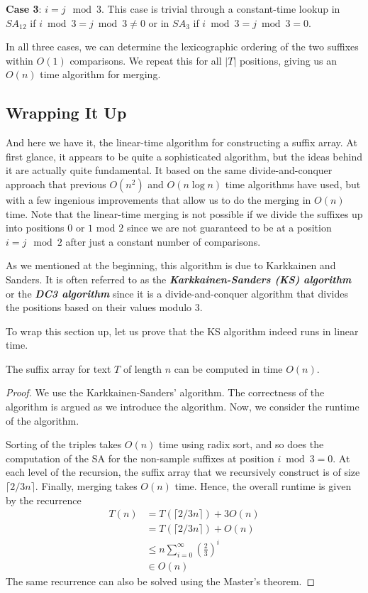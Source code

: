\textbf{Case 3}: $i = j \mod 3$. This case is trivial through a constant-time lookup in $SA_{12}$ if $i \bmod 3 = j \bmod 3 \neq 0$ or in $SA_{3}$ if $i \bmod 3 = j \bmod 3 = 0$.

In all three cases, we can determine the lexicographic ordering of the two suffixes within $O(1)$ comparisons. We repeat this for all $|T|$ positions, giving us an $O(n)$ time algorithm for merging.

\subsection{Wrapping It Up}

And here we have it, the linear-time algorithm for constructing a suffix array. At first glance, it appears to be quite a sophisticated algorithm, but the ideas behind it are actually quite fundamental. It based on the same divide-and-conquer approach that previous $O(n^2)$ and $O(n \log n)$ time algorithms have used, but with a few ingenious improvements that allow us to do the merging in $O(n)$ time. Note that the linear-time merging is not possible if we divide the suffixes up into positions $0$ or $1$ mod $2$ since we are not guaranteed to be at a position $i=j \mod 2$ after just a constant number of comparisons.

As we mentioned at the beginning, this algorithm is due to Karkkainen and Sanders. It is often referred to as the \textit{\textbf{Karkkainen-Sanders (KS) algorithm}} or the \textit{\textbf{DC3 algorithm}} since it is a divide-and-conquer algorithm that divides the positions based on their values modulo 3.

To wrap this section up, let us prove that the KS algorithm indeed runs in linear time.

\begin{theorem}
    The suffix array for text $T$ of length $n$ can be computed in time $O(n)$.
\end{theorem}

\begin{proof}
    We use the Karkkainen-Sanders' algorithm. The correctness of the algorithm is argued as we introduce the algorithm. Now, we consider the runtime of the algorithm.

    Sorting of the triples takes $O(n)$ time using radix sort, and so does the computation of the SA for the non-sample suffixes at position $i \bmod 3 = 0$. At each level of the recursion, the suffix array that we recursively construct is of size $\lceil 2/3n \rceil$. Finally, merging takes $O(n)$ time. Hence, the overall runtime is given by the recurrence
    $$
    \begin{aligned}
        T(n) &= T(\lceil 2/3n \rceil) + 3O(n) \\
        &= T(\lceil 2/3n \rceil) + O(n) \\
        &\leq n \sum_{i=0}^\infty \left( \frac{2}{3} \right)^i \\
        &\in O(n) 
    \end{aligned}
    $$
    The same recurrence can also be solved using the Master's theorem.
\end{proof}